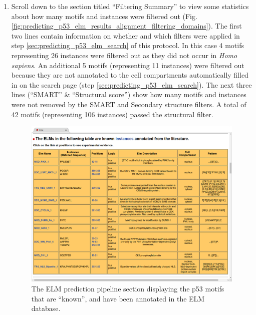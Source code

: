 \documentclass[12pt]{article}
\newcounter{proto}
\begin{document}
\begin{enumerate}
\item Scroll down to the section titled ``Filtering Summary'' to view some
	statistics about how many motifs and instances were filtered out
	(Fig.
	\ref{fig:predicting_p53_elm_results_alignment_filtering_domains}).
	The first two lines contain information on whether
	and which filters were applied in step \ref{sec:predicting_p53_elm_search} of this protocol.
	In this case 4 motifs representing 26 instances were filtered
	out as they did not occur in \textit{Homo sapiens}. An additional 5
	motifs (representing 11 instances) were filtered out because they are
	not annotated to the cell compartments automatically filled in on the
	search page (step \ref{sec:predicting_p53_elm_search}).
	The next three lines (``SMART'' \& ``Structural score'') show how many
	motifs and instances were not removed by the SMART and Secondary
	structure filters. A total of 42 motifs (representing 106 instances)
	passed the structural filter.


\begin{figure}[h!]
	\centering
	\includegraphics[width=\textwidth]{Figures/predicting_p53/elm_results_known.png}
	\caption{
		The ELM prediction pipeline section displaying the p53 motifs
		that are ``known'', and have been annotated in the ELM
		database.
	}
	\label{fig:predicting_p53_elm_results_known}
\end{figure}


\end{enumerate}
\end{document}
